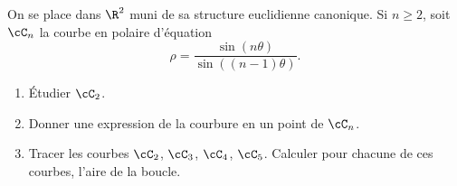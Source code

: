 \begin{enonce}
\begin{exercise}[ID={RMS 122-2 E1124 Centrale PC},subtitle={},tags={}]
On se place dans $\R^2$ muni de sa structure euclidienne canonique.
Si $n\geq 2$, soit $\cC_n$ la courbe en polaire d'équation
\begin{equation*}
  \rho = \frac{\sin(n\theta)}{\sin\left( (n-1)\theta \right)}.
\end{equation*}
\begin{enumerate}
  \item Étudier $\cC_2$.
  \item Donner une expression de la courbure en un point de $\cC_n$.
  \item Tracer les courbes $\cC_2$, $\cC_3$, $\cC_4$, $\cC_5$.
    Calculer pour chacune de ces courbes, l'aire de la boucle.
\end{enumerate}
\end{exercise}
\begin{solution}
\end{solution}
\end{enonce}
